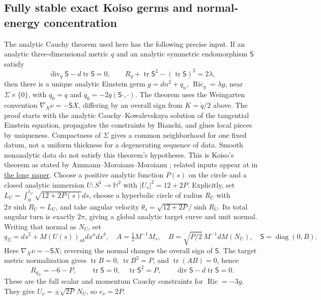 \documentclass[a4paper,11pt]{article}
\numberwithin{equation}{section}
\theoremstyle{definition}
\newcommand{\Ric}{\operatorname{Ric}}
\newcommand{\tr}{\operatorname{tr}}
\begin{document}
\subsection{Fully stable exact Koiso germs and normal-energy concentration}
The analytic Cauchy theorem used here has the following precise input.
If an analytic three-dimensional metric $q$ and an analytic symmetric endomorphism $\mathsf S$ satisfy
\[
 \operatorname{div}_q\mathsf S-d\tr\mathsf S=0,\qquad
 R_q+\tr\mathsf S^2-(\tr\mathsf S)^2=2\lambda,
\]
then there is a unique analytic Einstein germ $g=dn^2+q_n$, $\Ric_g=\lambda g$, near $\Sigma\times\{0\}$, with $q_0=q$ and $\dot q_0=-2q(\mathsf S\cdot,\cdot)$.
The theorem uses the Weingarten convention $\nabla_X\nu=-\mathsf S X$, differing by an overall sign from $K=\dot q/2$ above.
The proof starts with the analytic Cauchy--Kowalevskaya solution of the tangential Einstein equation, propagates the constraints by Bianchi, and glues local pieces by uniqueness.
Compactness of $\Sigma$ gives a common neighborhood for one fixed datum, not a uniform thickness for a degenerating sequence of data.
Smooth nonanalytic data do not satisfy this theorem's hypotheses.
This is Koiso's theorem as stated by Ammann--Moroianu--Moroianu \cite[Theorem 2.1]{Ammann}; related inputs appear at  in \href{20260912.tex}{the long paper}.
Choose a positive analytic function $P(s)$ on the circle and a closed analytic immersion $U:S^1\to\mathbb H^2$ with $|U_s|^2=12+2P$.
Explicitly, set $L_U=\int_0^{\ell_C}\sqrt{12+2P(s)}ds$, choose a hyperbolic circle of radius $R_U$ with $2\pi\sinh R_U=L_U$, and take angular velocity $\theta_s=\sqrt{12+2P}/\sinh R_U$.
Its total angular turn is exactly $2\pi$, giving a global analytic target curve and unit normal.
Writing that normal as $N_U$, set
\[
 q_\Sigma=ds^2+M(U(s))_{ab}dx^adx^b,
 \quad A=\tfrac12M^{-1}M_s,
 \quad B=\sqrt{P/2}\,M^{-1}dM(N_U),
 \quad \mathsf S=\operatorname{diag}(0,B).
\]
Here $\nabla_X\nu=-\mathsf S X$; reversing the normal changes the overall sign of $\mathsf S$.
The target metric normalization gives $\tr B=0$, $\tr B^2=P$, and $\tr(AB)=0$, hence
\[
 R_{q_\Sigma}=-6-P,\qquad\tr\mathsf S=0,
 \quad\tr\mathsf S^2=P,\qquad
 \operatorname{div}\mathsf S-d\tr\mathsf S=0.
\]
These are the full scalar and momentum Cauchy constraints for $\Ric=-3g$.
They give $U_\nu=\pm\sqrt{2P}\,N_U$, so $e_\nu=2P$.
\end{document}
